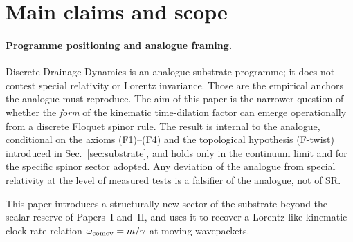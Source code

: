 \documentclass[11pt,a4paper]{article}
\begin{document}
\noindent{}
\bigskip


\section{Main claims and scope}
\label{sec:claims}

\paragraph{Programme positioning and analogue framing.}
Discrete Drainage Dynamics is an analogue-substrate programme;
it does not contest special relativity or Lorentz invariance.
Those are the empirical anchors the analogue must reproduce.
The aim of this paper is the narrower question of whether the
\emph{form} of the kinematic time-dilation factor can emerge
operationally from a discrete Floquet spinor rule. The result
is internal to the analogue, conditional on the axioms
(F1)--(F4) and the topological hypothesis (F-twist) introduced
in Sec.~\ref{sec:substrate}, and holds only in the continuum
limit and for the specific spinor sector adopted. Any deviation
of the analogue from special relativity at the level of
measured tests is a falsifier of the analogue, not of SR.


This paper introduces a structurally new sector of the substrate
beyond the scalar reserve of Papers~I and~II, and uses it to
recover a Lorentz-like kinematic clock-rate relation
$\omega_{\rm comov} = m/\gamma$ at moving wavepackets.
\end{document}
